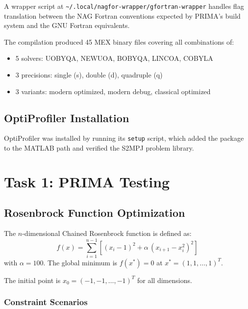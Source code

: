 \documentclass[11pt,a4paper]{article}
\begin{document}
A wrapper script at \texttt{\textasciitilde/.local/nagfor-wrapper/gfortran-wrapper}
handles flag translation between the NAG Fortran conventions expected by
PRIMA's build system and the GNU Fortran equivalents.

The compilation produced 45 MEX binary files covering all combinations of:
\begin{itemize}[noitemsep]
    \item 5 solvers: UOBYQA, NEWUOA, BOBYQA, LINCOA, COBYLA
    \item 3 precisions: single (s), double (d), quadruple (q)
    \item 3 variants: modern optimized, modern debug, classical optimized
\end{itemize}

\subsection{OptiProfiler Installation}

OptiProfiler was installed by running its \texttt{setup} script, which
added the package to the MATLAB path and verified the S2MPJ problem library.

\section{Task 1: PRIMA Testing}

\subsection{Rosenbrock Function Optimization}

The $n$-dimensional Chained Rosenbrock function is defined as:
\begin{equation}
f(x) = \sum_{i=1}^{n-1} \left[ (x_i - 1)^2 + \alpha \, (x_{i+1} - x_i^2)^2 \right]
\label{eq:rosenbrock}
\end{equation}
with $\alpha = 100$. The global minimum is $f(x^*) = 0$ at $x^* = (1, 1, \ldots, 1)^T$.

The initial point is $x_0 = (-1, -1, \ldots, -1)^T$ for all dimensions.

\subsubsection{Constraint Scenarios}
\end{document}
